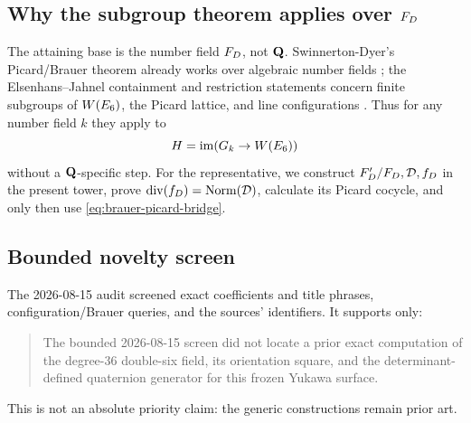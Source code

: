 \subsection{Why the subgroup theorem applies over
\texorpdfstring{\(F_D\)}{F-D}}

The attaining base is the number field \(F_D\), not \(\mathbf Q\).
Swinnerton-Dyer's Picard/Brauer theorem already works over algebraic number
fields \cite{SwinnertonDyer1993}; the Elsenhans--Jahnel containment and
restriction statements concern finite subgroups of \(W(E_6)\), the Picard
lattice, and line configurations \cite{ElsenhansJahnel2010Brauer}.  Thus for
any number field \(k\) they apply to
\[
 H=\operatorname{im}(G_k\to W(E_6))
\]
without a \(\mathbf Q\)-specific step.  For the representative, we construct
\(F_D'/F_D,\mathcal D,f_D\) in the present tower, prove
\(\operatorname{div}(f_D)=\operatorname{Norm}(\mathcal D)\), calculate its Picard cocycle, and only then use
\cref{eq:brauer-picard-bridge}.

\subsection{Bounded novelty screen}

The 2026-08-15 audit screened exact coefficients and title phrases,
configuration/Brauer queries, and the sources' identifiers.  It supports only:
\begin{quote}
The bounded 2026-08-15 screen did not locate a prior exact computation of the
degree-36 double-six field, its orientation square, and the
determinant-defined quaternion generator for this frozen Yukawa surface.
\end{quote}
This is not an absolute priority claim: the generic constructions remain
prior art.
